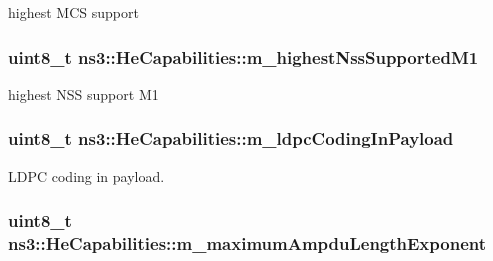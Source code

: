 highest M\+CS support 

\subsubsection[{\texorpdfstring{m\+\_\+highest\+Nss\+Supported\+M1}{m_highestNssSupportedM1}}]{\setlength{\rightskip}{0pt plus 5cm}uint8\+\_\+t ns3\+::\+He\+Capabilities\+::m\+\_\+highest\+Nss\+Supported\+M1\hspace{0.3cm}{\ttfamily [private]}}\hypertarget{classns3_1_1HeCapabilities_ae57448a35564e5ca6ef6a61be6417af0}{}\label{classns3_1_1HeCapabilities_ae57448a35564e5ca6ef6a61be6417af0}


highest N\+SS support M1 

\subsubsection[{\texorpdfstring{m\+\_\+ldpc\+Coding\+In\+Payload}{m_ldpcCodingInPayload}}]{\setlength{\rightskip}{0pt plus 5cm}uint8\+\_\+t ns3\+::\+He\+Capabilities\+::m\+\_\+ldpc\+Coding\+In\+Payload\hspace{0.3cm}{\ttfamily [private]}}\hypertarget{classns3_1_1HeCapabilities_a536bed2c74547655822291fe6201ee8c}{}\label{classns3_1_1HeCapabilities_a536bed2c74547655822291fe6201ee8c}


L\+D\+PC coding in payload. 

\subsubsection[{\texorpdfstring{m\+\_\+maximum\+Ampdu\+Length\+Exponent}{m_maximumAmpduLengthExponent}}]{\setlength{\rightskip}{0pt plus 5cm}uint8\+\_\+t ns3\+::\+He\+Capabilities\+::m\+\_\+maximum\+Ampdu\+Length\+Exponent\hspace{0.3cm}{\ttfamily [private]}}\hypertarget{classns3_1_1HeCapabilities_a720c53d4f149e5b47945c9e9b5882090}{}\label{classns3_1_1HeCapabilities_a720c53d4f149e5b47945c9e9b5882090}


